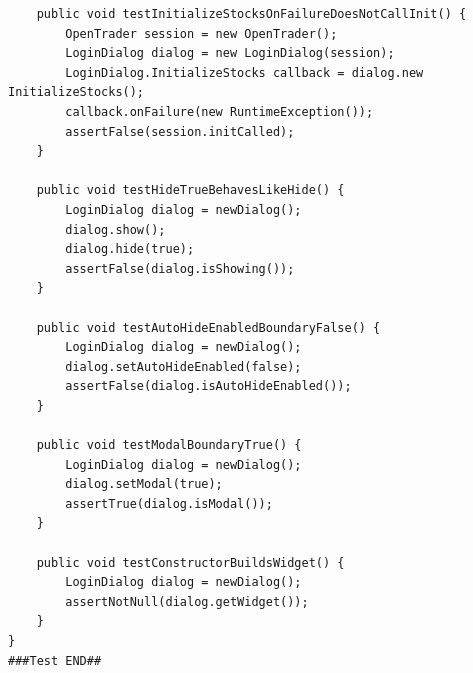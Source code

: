 \begin{lstlisting}
    public void testInitializeStocksOnFailureDoesNotCallInit() {
        OpenTrader session = new OpenTrader();
        LoginDialog dialog = new LoginDialog(session);
        LoginDialog.InitializeStocks callback = dialog.new InitializeStocks();
        callback.onFailure(new RuntimeException());
        assertFalse(session.initCalled);
    }

    public void testHideTrueBehavesLikeHide() {
        LoginDialog dialog = newDialog();
        dialog.show();
        dialog.hide(true);
        assertFalse(dialog.isShowing());
    }

    public void testAutoHideEnabledBoundaryFalse() {
        LoginDialog dialog = newDialog();
        dialog.setAutoHideEnabled(false);
        assertFalse(dialog.isAutoHideEnabled());
    }

    public void testModalBoundaryTrue() {
        LoginDialog dialog = newDialog();
        dialog.setModal(true);
        assertTrue(dialog.isModal());
    }

    public void testConstructorBuildsWidget() {
        LoginDialog dialog = newDialog();
        assertNotNull(dialog.getWidget());
    }
}
###Test END##
\end{lstlisting}

